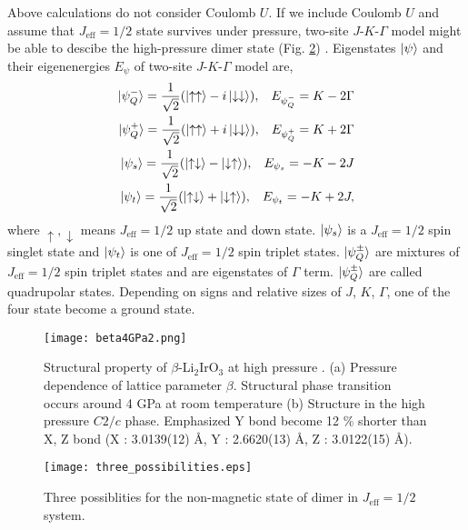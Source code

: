 Above calculations do not consider Coulomb $U$.
If we include Coulomb $U$ and assume that $J_{\mathrm{eff}} = 1/2$ state survives under pressure, two-site $J$-$K$-$\Gamma$ model might be able to descibe the high-pressure dimer state (Fig. \ref{three}) \cite{Nasu2014}.
Eigenstates $\ket{\psi}$ and their eigenenergies $E_\psi$ of two-site $J$-$K$-$\Gamma$ model are,
\begin{align}
  \ket{\psi^-_Q} = \frac{1}{\sqrt{2}}(\ket{\uparrow\uparrow}-i\ket{\downarrow\downarrow}),
  \hspace{3mm}
  E_{\psi^-_Q} = K - 2\Gamma\\
  \ket{\psi^+_Q} = \frac{1}{\sqrt{2}}(\ket{\uparrow\uparrow}+i\ket{\downarrow\downarrow}),
  \hspace{3mm}
  E_{\psi^+_Q} = K + 2\Gamma\\
  \ket{\psi_s} = \frac{1}{\sqrt{2}}(\ket{\uparrow\downarrow}-\ket{\downarrow\uparrow}),
  \hspace{3mm}
  E_{\psi_s} = - K - 2J\\
  \ket{\psi_t} = \frac{1}{\sqrt{2}}(\ket{\uparrow\downarrow}+\ket{\downarrow\uparrow}),
  \hspace{3mm}
  E_{\psi_t} = - K + 2J,
\end{align}
where $\uparrow, \downarrow$ means $J_{\mathrm{eff}} = 1/2$ up state and down state.
$\ket{\psi_s}$ is a $J_{\mathrm{eff}} = 1/2$ spin singlet state and $\ket{\psi_t}$ is one of $J_{\mathrm{eff}} = 1/2$ spin triplet states.
$\ket{\psi^\pm_Q}$ are mixtures of $J_{\mathrm{eff}} = 1/2$ spin triplet states and are eigenstates of $\Gamma$ term.
$\ket{\psi^\pm_Q}$ are called quadrupolar states.
Depending on signs and relative sizes of $J$, $K$, $\Gamma$, one of the four state become a ground state.

\begin{figure}
  \centering
  \texttt{[image: beta4GPa2.png]}
  \caption{Structural property of $\beta$-Li$_2$IrO$_3$ at high pressure \cite{veiga2017pressure}.
  (a) Pressure dependence of lattice parameter $\beta$.
  Structural phase transition occurs around 4 GPa at room temperature
  (b) Structure in the high pressure $C2/c$ phase.
  Emphasized Y bond become 12 \% shorter than X, Z bond (X : 3.0139(12) \AA, Y : 2.6620(13) \AA, Z : 3.0122(15) \AA). }
  \label{beta4GPa}
\end{figure}

\begin{figure}
  \centering
  \texttt{[image: three\_possibilities.eps]}
  \caption{Three possiblities for the non-magnetic state of dimer in $J_{\mathrm{eff}} = 1/2$ system.}
  \label{three}
\end{figure}

